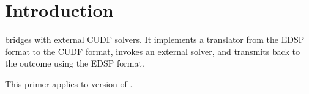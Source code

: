 
\section{Introduction}
\aptcudf{} bridges \aptget{} with external CUDF solvers. It implements
a translator from the EDSP \cite{} format to the CUDF \cite{}
format, invokes an external solver, and transmits back to \aptget{}
the outcome using the EDSP format.

This primer applies to version \version{} of \aptcudf.
